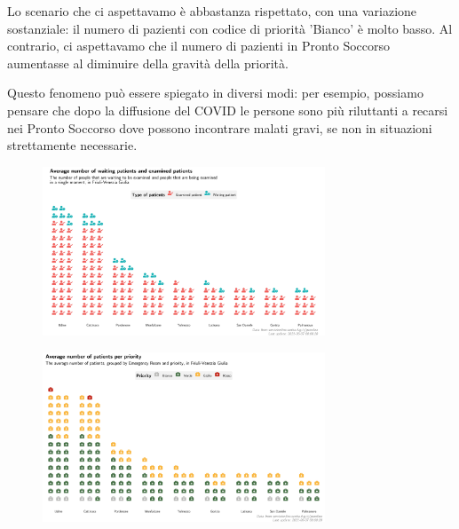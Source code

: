\documentclass[8pt,english,aspectratio=169]{beamer}
\begin{document}
\begin{frame}
{Lo scenario che ci aspettavamo è abbastanza rispettato, con una variazione sostanziale: il numero di pazienti con codice di priorità 'Bianco' è molto basso.
Al contrario, ci aspettavamo che il numero di pazienti in Pronto Soccorso aumentasse al diminuire della gravità della priorità.

Questo fenomeno può essere spiegato in diversi modi: per esempio, possiamo pensare che dopo la diffusione del COVID le persone sono più riluttanti a recarsi nei Pronto Soccorso dove possono incontrare malati gravi, se non in situazioni strettamente necessarie.}
\end{frame}

\begin{frame}
\begin{figure}
  \centering
  \includegraphics[width=0.75\textwidth]{../images/08_waiting-examined_waffle.jpg}
\end{figure}
\note{\dots}
\end{frame}

\begin{frame}
\begin{figure}
  \centering
  \includegraphics[width=0.75\textwidth]{../images/09_priority_waffle.jpg}
\end{figure}
\note{\dots}
\end{frame}
\end{document}
